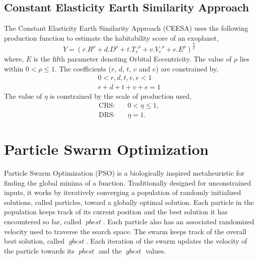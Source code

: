 \documentclass[9pt]{article}
\DeclareMathOperator*{\pbest}{\mathit{pbest}}
\DeclareMathOperator*{\gbest}{\mathit{gbest}}
\begin{document}
\subsection{Constant Elasticity Earth Similarity Approach}\label{subsec:ceesa}
The Constant Elasticity Earth Similarity Approach (CEESA) uses the following production function to estimate the
habitability score of an exoplanet,
\begin{equation}\label{eq:ceesa}
  Y = {(r.R^\rho+d.D^\rho+t.{T_s}^\rho+v.{V_e}^\rho+e.E^\rho)}^{\frac{\eta}{\rho}}
\end{equation}
where, $E$ is the fifth parameter denoting Orbital Eccentricity. The value of $\rho$ lies within $0<\rho\leq 1$.
The coefficients ($r$, $d$, $t$, $v$ and $e$) are constrained by,
\begin{subequations}
  \begin{align}
      0 < r,d,t,v,e < 1\\
      r+d+t+v+e = 1
  \end{align}
\end{subequations}
The value of $\eta$ is constrained by the scale of production used,
\begin{subequations}
  \begin{alignat}{3}
    \text{CRS:} & \quad 0 < \eta \leq 1,\\
    \text{DRS:} & \quad \eta = 1.
  \end{alignat}
\end{subequations}


\section{Particle Swarm Optimization}\label{sec:pso}

Particle Swarm Optimization (PSO) is a biologically inspired metaheuristic for finding the global minima of a function.
Traditionally designed for unconstrained inputs, it works by iteratively converging a population of randomly initialized
solutions, called particles, toward a globally optimal solution. Each particle in the population keeps track of its
current position and the best solution it has encountered so far, called $\pbest$. Each particle also has an associated
randomized velocity used to traverse the search space. The swarm keeps track of the overall best solution, called
$\gbest$. Each iteration of the swarm updates the velocity of the particle towards its $\pbest$ and the $\gbest$ values.
\end{document}
